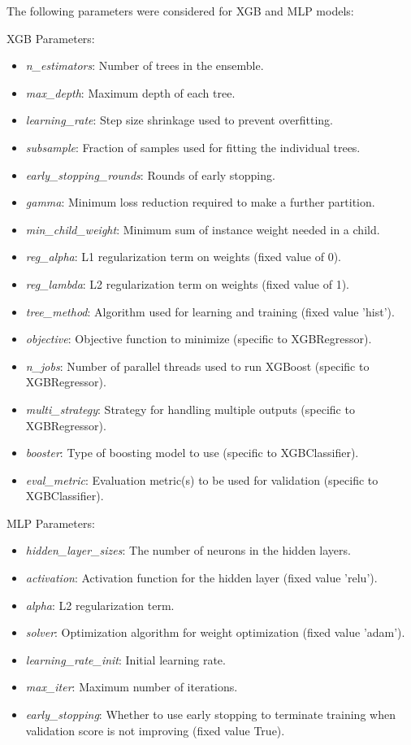 \vspace{\baselineskip}
\noindent
The following parameters were considered for XGB and MLP models: \par
\vspace{\baselineskip}
\noindent
XGB Parameters:
\begin{itemize} 
    \item \textit{n\_estimators}: Number of trees in the ensemble.
    \item \textit{max\_depth}: Maximum depth of each tree.
    \item \textit{learning\_rate}: Step size shrinkage used to prevent overfitting.
    \item \textit{subsample}: Fraction of samples used for fitting the individual trees.
    \item \textit{early\_stopping\_rounds}: Rounds of early stopping.
    \item \textit{gamma}: Minimum loss reduction required to make a further partition.
    \item \textit{min\_child\_weight}: Minimum sum of instance weight needed in a child.
    \item \textit{reg\_alpha}: L1 regularization term on weights (fixed value of 0).
    \item \textit{reg\_lambda}: L2 regularization term on weights (fixed value of 1).
    \item \textit{tree\_method}: Algorithm used for learning and training (fixed value 'hist').
    \item \textit{objective}: Objective function to minimize (specific to XGBRegressor).
    \item \textit{n\_jobs}: Number of parallel threads used to run XGBoost (specific to XGBRegressor).
    \item \textit{multi\_strategy}: Strategy for handling multiple outputs (specific to XGBRegressor).
    \item \textit{booster}: Type of boosting model to use (specific to XGBClassifier).
    \item \textit{eval\_metric}: Evaluation metric(s) to be used for validation (specific to XGBClassifier).
\end{itemize}
\noindent
MLP Parameters:
\begin{itemize}
    \item \textit{hidden\_layer\_sizes}: The number of neurons in the hidden layers.
    \item \textit{activation}: Activation function for the hidden layer (fixed value 'relu').
    \item \textit{alpha}: L2 regularization term.
    \item \textit{solver}: Optimization algorithm for weight optimization (fixed value 'adam').
    \item \textit{learning\_rate\_init}: Initial learning rate.
    \item \textit{max\_iter}: Maximum number of iterations.
    \item \textit{early\_stopping}: Whether to use early stopping to terminate training when validation score is not improving (fixed value True).
\end{itemize}

